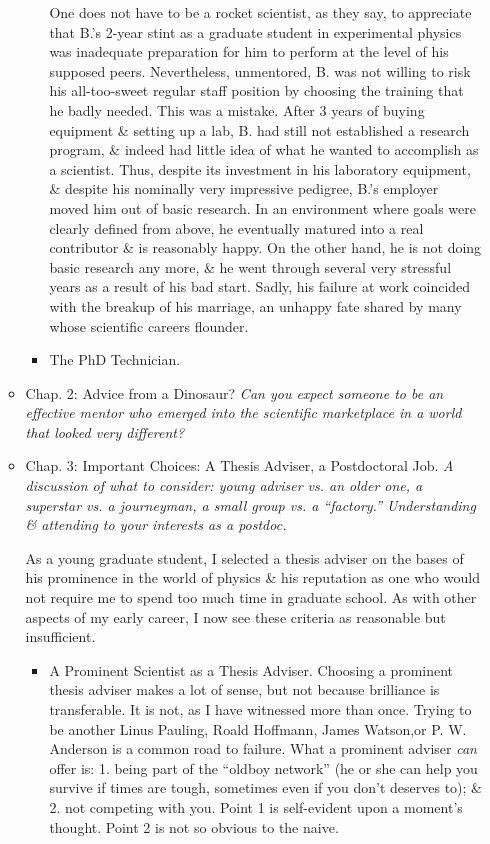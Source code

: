 \documentclass{article}
\begin{document}
\begin{enumerate}
\begin{itemize}
\begin{itemize}
			One does not have to be a rocket scientist, as they say, to appreciate that B.'s 2-year stint as a graduate student in experimental physics was inadequate preparation for him to perform at the level of his supposed peers. Nevertheless, unmentored, B. was not willing to risk his all-too-sweet regular staff position by choosing the training that he badly needed. This was a mistake. After 3 years of buying equipment \& setting up a lab, B. had still not established a research program, \& indeed had little idea of what he wanted to accomplish as a scientist. Thus, despite its investment in his laboratory equipment, \& despite his nominally very impressive pedigree, B.'s employer moved him out of basic research. In an environment where goals were clearly defined from above, he eventually matured into a real contributor \& is reasonably happy. On the other hand, he is not doing basic research any more, \& he went through several very stressful years as a result of his bad start. Sadly, his failure at work coincided with the breakup of his marriage, an unhappy fate shared by many whose scientific careers flounder.
			\item {\sf The PhD Technician.}
		\end{itemize}
		
		\item {\sf Chap. 2: Advice from a Dinosaur?} {\it Can you expect someone to be an effective mentor who emerged into the scientific marketplace in a world that looked very different?}
		
		\item {\sf Chap. 3: Important Choices: A Thesis Adviser, a Postdoctoral Job.} {\it A discussion of what to consider: young adviser vs. an older one, a superstar vs. a journeyman, a small group vs. a ``factory.'' Understanding \& attending to your interests as a postdoc.}
		
		As a young graduate student, I selected a thesis adviser on the bases of his prominence in the world of physics \& his reputation as one who would not require me to spend too much time in graduate school. As with other aspects of my early career, I now see these criteria as reasonable but insufficient.
		\begin{itemize}
			\item {\sf A Prominent Scientist as a Thesis Adviser.} Choosing a prominent thesis adviser makes a lot of sense, but not because brilliance is transferable. It is not, as I have witnessed more than once. Trying to be another Linus Pauling, Roald Hoffmann, James Watson,or P. W. Anderson is a common road to failure. What a prominent adviser \textit{can} offer is: 1. being part of the ``oldboy network'' (he or she can help you survive if times are tough, sometimes even if you don't deserves to); \& 2. not competing with you. Point 1 is self-evident upon a moment's thought. Point 2 is not so obvious to the naive.
			

\end{itemize}
\end{itemize}
\end{enumerate}
\end{document}
